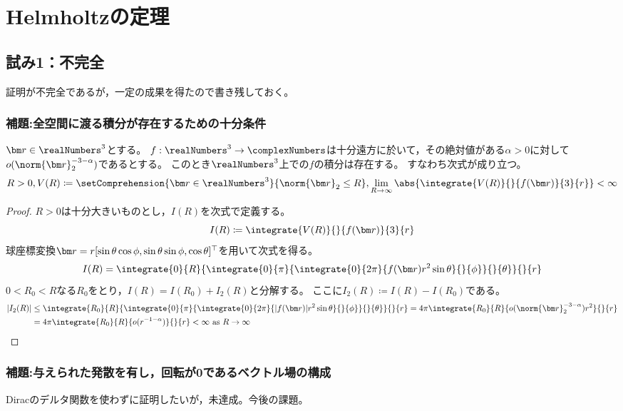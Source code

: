     \section{Helmholtzの定理}
        \subsection{試み1：不完全}
            証明が不完全であるが，一定の成果を得たので書き残しておく。
            \subsubsection{補題:全空間に渡る積分が存在するための十分条件}
                \label{全空間に渡る積分が存在するための十分条件}
                \begin{shadebox}
                    $\vr\in\realNumbers^3$とする。
                    $f:\realNumbers^3\to\complexNumbers$は十分遠方に於いて，その絶対値がある$\alpha>0$に対して$o(\norm{\vr}_2^{-3-\alpha})$であるとする。
                    このとき$\realNumbers^3$上での$f$の積分は存在する。
                    すなわち次式が成り立つ。
                    \[ R>0, V(R) \coloneq \setComprehension{\vr\in\realNumbers^3}{\norm{\vr}_2 \leq R} ,\lim_{R\to\infty} \abs{\integrate{V(R)}{}{f(\vr)}{3}{r}} < \infty \]
                \end{shadebox}
                \begin{proof}
                    $R>0$は十分大きいものとし，$I(R)$を次式で定義する。
                    \[ I(R) \coloneq \integrate{V(R)}{}{f(\vr)}{3}{r} \]
                    球座標変換$\vr = r[\sin\theta\cos\phi,\sin\theta\sin\phi,\cos\theta]^\top$を用いて次式を得る。
                    \[ I(R) = \integrate{0}{R}{\integrate{0}{\pi}{\integrate{0}{2\pi}{f(\vr)r^2\sin\theta}{}{\phi}}{}{\theta}}{}{r} \]
                    $0<R_0<R$なる$R_0$をとり，$I(R) = I(R_0) + I_2(R)$と分解する。
                    ここに$I_2(R) \coloneq I(R) - I(R_0)$である。
                    \begin{align*}
                        |I_2(R)| &\leq \integrate{R_0}{R}{\integrate{0}{\pi}{\integrate{0}{2\pi}{|f(\vr)|r^2\sin\theta}{}{\phi}}{}{\theta}}{}{r} = 4\pi\integrate{R_0}{R}{o(\norm{\vr}_2^{-3-\alpha})r^2}{}{r} \\
                        &= 4\pi\integrate{R_0}{R}{o(r^{-1-\alpha})}{}{r} < \infty \text{ as } R\to\infty
                    \end{align*}
                \end{proof}
            \subsubsection{補題:与えられた発散を有し，回転が\texorpdfstring{$\bm{0}$}{0}であるベクトル場の構成}
                \label{与えられた発散を有し，回転が無いベクトル場の構成}
                Diracのデルタ関数を使わずに証明したいが，未達成。今後の課題。
